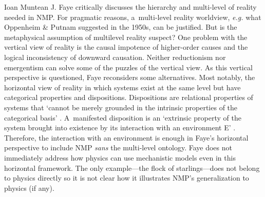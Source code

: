 \begin{recengenv}{Ioan Muntean}
J. Faye critically discusses the hierarchy and multi-level of reality needed in NMP. For pragmatic reasons, a~multi-level reality worldview, \textit{e.g.} what Oppenheim \& Putnam
\parencite*[][]{oppenheim_unity_1958} %
 suggested in the 1950s, can be justified. But is the metaphysical assumption of multilevel reality suspect? One problem with the vertical view of reality is the causal impotence of higher-order causes and the logical inconsistency of downward causation. Neither reductionism nor emergentism can solve some of the puzzles of the vertical view. As this vertical perspective is questioned, Faye reconsiders some alternatives. Most notably, the horizontal view of reality in which systems exist at the same level but have categorical properties and dispositions. Dispositions are relational properties of systems that ‘cannot be merely grounded in the intrinsic properties of the categorical basis' 
\parencite*[][p.177]{falkenburg_mechanistic_2019}. %
 A~manifested disposition is an ‘extrinsic property of the system brought into existence by its interaction with an environment E' 
\parencite*[][p.179]{falkenburg_mechanistic_2019}. %
 Therefore, the interaction with an environment is enough in Faye's horizontal perspective to include NMP \textit{sans} the multi-level ontology. Faye does not immediately address how physics can use mechanistic models even in this horizontal framework. The only example---the flock of starlings---does not belong to physics directly so it is not clear how it illustrates NMP's generalization to physics (if any).


\end{recengenv}
